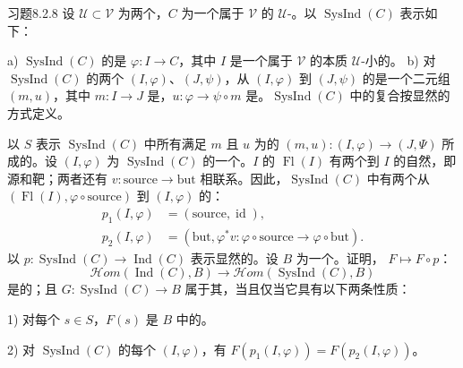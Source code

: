 \begin{SGAresult}{习题}{8.2.8}
设 $\mathcal U\subset\mathcal V$ 为两个，$C$ 为一个属于 $\mathcal V$ 的 $\mathcal U$-。以 $\operatorname{SysInd}(C)$ 表示如下：

 a) $\operatorname{SysInd}(C)$ 的是 $\varphi:I\to C$，其中 $I$ 是一个属于 $\mathcal V$ 的本质 $\mathcal U$-小的。
 b) 对 $\operatorname{SysInd}(C)$ 的两个 $(I,\varphi)$、$(J,\psi)$，从 $(I,\varphi)$ 到 $(J,\psi)$ 的是一个二元组 $(m,u)$，其中 $m:I\to J$ 是，$u:\varphi\to\psi\circ m$ 是。$\operatorname{SysInd}(C)$ 中的复合按显然的方式定义。

以 $S$ 表示 $\operatorname{SysInd}(C)$ 中所有满足 $m$ 且 $u$ 为的 $(m,u):(I,\varphi)\to(J,\Psi)$ 所成的。设 $(I,\varphi)$ 为 $\operatorname{SysInd}(C)$ 的一个。$I$ 的 $\operatorname{Fl}(I)$ 有两个到 $I$ 的自然，即源和靶；两者还有 $v:\mathrm{source}\to\mathrm{but}$ 相联系。因此，$\operatorname{SysInd}(C)$ 中有两个从 $(\operatorname{Fl}(I),\varphi\circ\mathrm{source})$ 到 $(I,\varphi)$ 的：
\[
\begin{aligned}
p_1(I,\varphi)&=(\mathrm{source},\operatorname{id}),\\
p_2(I,\varphi)&=(\mathrm{but},\varphi^*v:\varphi\circ\mathrm{source}\to\varphi\circ\mathrm{but}).
\end{aligned}
\]
以 $p:\operatorname{SysInd}(C)\to\operatorname{Ind}(C)$ 表示显然的。设 $B$ 为一个。证明， $F\mapsto F\circ p$：
\[
\mathscr{H}\!om(\operatorname{Ind}(C),B)\longrightarrow
\mathscr{H}\!om(\operatorname{SysInd}(C),B)
\]
是的；且 $G:\operatorname{SysInd}(C)\to B$ 属于其，当且仅当它具有以下两条性质：

1) 对每个 $s\in S$，$F(s)$ 是 $B$ 中的。

2) 对 $\operatorname{SysInd}(C)$ 的每个 $(I,\varphi)$，有 $F(p_1(I,\varphi))=F(p_2(I,\varphi))$。
\end{SGAresult}


